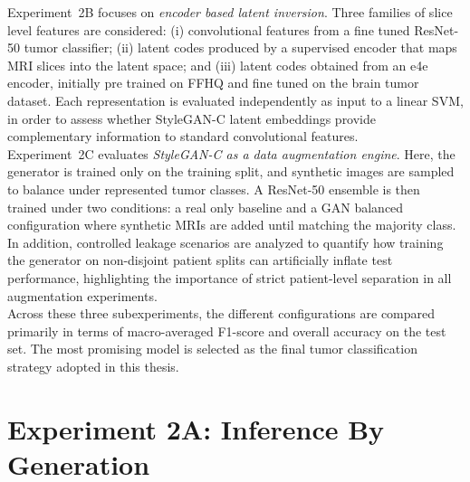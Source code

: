 Experiment~2B focuses on \emph{encoder based latent inversion}. Three families of slice level features are considered: (i) convolutional features from a fine tuned ResNet-50 tumor classifier; (ii) latent codes produced by a supervised encoder that maps MRI slices into the latent space; and (iii) latent codes obtained from an e4e encoder, initially pre trained on FFHQ and fine tuned on the brain tumor dataset. Each representation is evaluated independently as input to a linear SVM, in order to assess whether StyleGAN-C latent embeddings provide complementary information to standard convolutional features.\\


Experiment~2C evaluates \emph{StyleGAN-C as a data augmentation engine}. Here, the generator is trained only on the training split, and synthetic images are sampled to balance under represented tumor classes. A ResNet-50 ensemble is then trained under two conditions: a real only baseline and a GAN balanced configuration where synthetic MRIs are added until matching the majority class. In addition, controlled leakage scenarios are analyzed to quantify how training the generator on non-disjoint patient splits can artificially inflate test performance, highlighting the importance of strict patient-level separation in all augmentation experiments.\\


Across these three subexperiments, the different configurations are compared primarily in terms of macro-averaged F1-score and overall accuracy on the test set. The most promising model is selected as the final tumor classification strategy adopted in this thesis.


\newpage

\section{Experiment 2A: Inference By Generation}
\label{subsec:gated_ensemble_lpips_simple}


